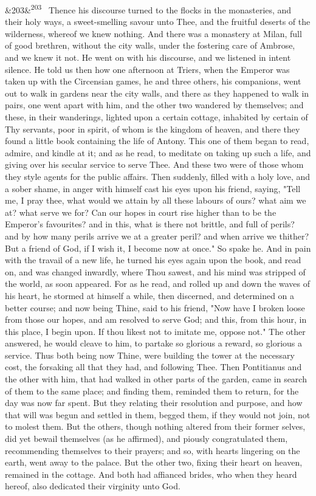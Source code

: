 \documentclass[12pt]{article}
\newcommand{\para}[1][]{\par\noindent\ifx&#1&\else\textsuperscript{\footnotesize #1}~\fi}
\begin{document}
\para[203] Thence his discourse turned to the flocks in the monasteries, and their holy ways, a sweet-smelling savour unto Thee, and the fruitful deserts of the wilderness, whereof we knew nothing. And there was a monastery at Milan, full of good brethren, without the city walls, under the fostering care of Ambrose, and we knew it not. He went on with his discourse, and we listened in intent silence. He told us then how one afternoon at Triers, when the Emperor was taken up with the Circensian games, he and three others, his companions, went out to walk in gardens near the city walls, and there as they happened to walk in pairs, one went apart with him, and the other two wandered by themselves; and these, in their wanderings, lighted upon a certain cottage, inhabited by certain of Thy servants, poor in spirit, of whom is the kingdom of heaven, and there they found a little book containing the life of Antony. This one of them began to read, admire, and kindle at it; and as he read, to meditate on taking up such a life, and giving over his secular service to serve Thee. And these two were of those whom they style agents for the public affairs. Then suddenly, filled with a holy love, and a sober shame, in anger with himself cast his eyes upon his friend, saying, "Tell me, I pray thee, what would we attain by all these labours of ours? what aim we at? what serve we for? Can our hopes in court rise higher than to be the Emperor's favourites? and in this, what is there not brittle, and full of perils? and by how many perils arrive we at a greater peril? and when arrive we thither? But a friend of God, if I wish it, I become now at once." So spake he. And in pain with the travail of a new life, he turned his eyes again upon the book, and read on, and was changed inwardly, where Thou sawest, and his mind was stripped of the world, as soon appeared. For as he read, and rolled up and down the waves of his heart, he stormed at himself a while, then discerned, and determined on a better course; and now being Thine, said to his friend, "Now have I broken loose from those our hopes, and am resolved to serve God; and this, from this hour, in this place, I begin upon. If thou likest not to imitate me, oppose not." The other answered, he would cleave to him, to partake so glorious a reward, so glorious a service. Thus both being now Thine, were building the tower at the necessary cost, the forsaking all that they had, and following Thee. Then Pontitianus and the other with him, that had walked in other parts of the garden, came in search of them to the same place; and finding them, reminded them to return, for the day was now far spent. But they relating their resolution and purpose, and how that will was begun and settled in them, begged them, if they would not join, not to molest them. But the others, though nothing altered from their former selves, did yet bewail themselves (as he affirmed), and piously congratulated them, recommending themselves to their prayers; and so, with hearts lingering on the earth, went away to the palace. But the other two, fixing their heart on heaven, remained in the cottage. And both had affianced brides, who when they heard hereof, also dedicated their virginity unto God.
\end{document}
